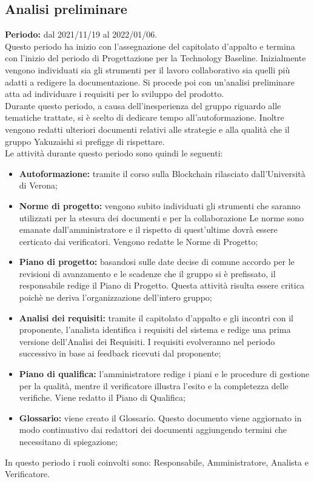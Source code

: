 \subsection{Analisi preliminare} \label{subsection:pianificazione_Analisi}
\textbf{Periodo:} dal 2021/11/19 al 2022/01/06.
\bigskip
\\Questo periodo ha inizio con l'assegnazione del capitolato d'appalto e termina con l'inizio del periodo di Progettazione per la Technology Baseline.
Inizialmente vengono individuati sia gli strumenti per il lavoro collaborativo sia quelli più adatti a redigere la documentazione.
Si procede poi con un'analisi preliminare atta ad individuare i requisiti per lo sviluppo del prodotto.
\\Durante questo periodo, a causa dell'inesperienza del gruppo riguardo alle tematiche trattate, si è scelto di dedicare tempo all'autoformazione.
Inoltre vengono redatti ulteriori documenti relativi alle strategie e alla qualità che il gruppo Yakuzaishi si prefigge di rispettare.
\\Le attività durante questo periodo sono quindi le seguenti:
\begin{itemize}
  \item \textbf{Autoformazione:} tramite il corso sulla Blockchain rilasciato dall'Università di Verona;
  \item \textbf{Norme di progetto:} vengono subito individuati gli strumenti che saranno utilizzati per la stesura dei documenti e per la collaborazione
  Le norme sono emanate dall'amministratore e il rispetto di quest'ultime dovrà essere certicato dai verificatori. Vengono redatte le Norme di Progetto;
  \item \textbf{Piano di progetto:} basandosi sulle date decise di comune accordo per le revisioni di avanzamento e le scadenze che il gruppo si è prefissato, il responsabile redige il Piano di Progetto.
  Questa attività risulta essere critica poichè ne deriva l'organizzazione dell'intero gruppo;
  \item \textbf{Analisi dei requisiti:} tramite il capitolato d'appalto e gli incontri con il proponente, l'analista identifica i requisiti del sistema e redige una prima versione dell'Analisi dei Requisiti.
  I requisiti evolveranno nel periodo successivo in base ai feedback ricevuti dal proponente;
  \item \textbf{Piano di qualifica:} l'amministratore redige i piani e le procedure di gestione per la qualità, mentre il verificatore illustra l'esito e la completezza delle verifiche. Viene redatto il Piano di Qualifica;
  \item \textbf{Glossario:} viene creato il Glossario. Questo documento viene aggiornato in modo continuativo dai redattori dei documenti aggiungendo termini che necessitano di spiegazione;
\end{itemize}
In questo periodo i ruoli coinvolti sono: Responsabile, Amministratore, Analista e Verificatore.

